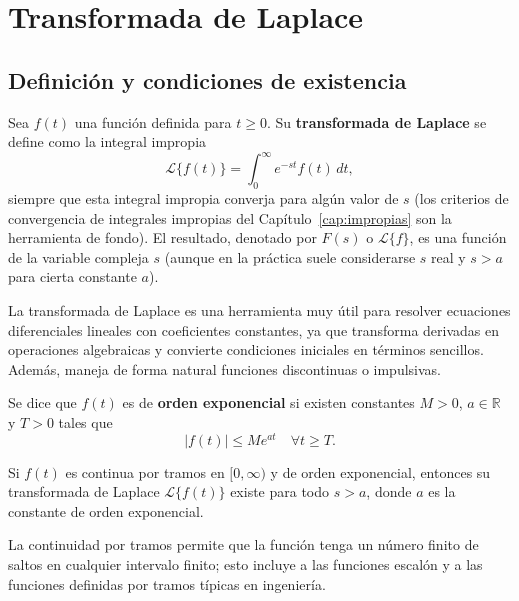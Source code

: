 \chapter{Transformada de Laplace}

\section{Definición y condiciones de existencia}

\begin{definition}
Sea $f(t)$ una función definida para $t \ge 0$. Su \textbf{transformada de Laplace} se define como la integral impropia
\[
\mathcal{L}\{f(t)\} = \int_0^\infty e^{-st} f(t)\,dt,
\]
siempre que esta integral impropia converja para algún valor de $s$ (los criterios de convergencia de integrales impropias del Capítulo~\ref{cap:impropias} son la herramienta de fondo). El resultado, denotado por $F(s)$ o $\mathcal{L}\{f\}$, es una función de la variable compleja $s$ (aunque en la práctica suele considerarse $s$ real y $s>a$ para cierta constante $a$).
\end{definition}

\begin{rem}
La transformada de Laplace es una herramienta muy útil para resolver ecuaciones diferenciales lineales con coeficientes constantes, ya que transforma derivadas en operaciones algebraicas y convierte condiciones iniciales en términos sencillos. Además, maneja de forma natural funciones discontinuas o impulsivas.
\end{rem}

\begin{definition}
Se dice que $f(t)$ es de \textbf{orden exponencial} si existen constantes $M>0$, $a\in\mathbb R$ y $T>0$ tales que
\[
|f(t)| \le M e^{a t}\quad \forall t\ge T.
\]
\end{definition}

\begin{theorem}
Si $f(t)$ es continua por tramos en $[0,\infty)$ y de orden exponencial, entonces su transformada de Laplace $\mathcal{L}\{f(t)\}$ existe para todo $s>a$, donde $a$ es la constante de orden exponencial.
\end{theorem}

\begin{rem}
La continuidad por tramos permite que la función tenga un número finito de saltos en cualquier intervalo finito; esto incluye a las funciones escalón y a las funciones definidas por tramos típicas en ingeniería.
\end{rem}

